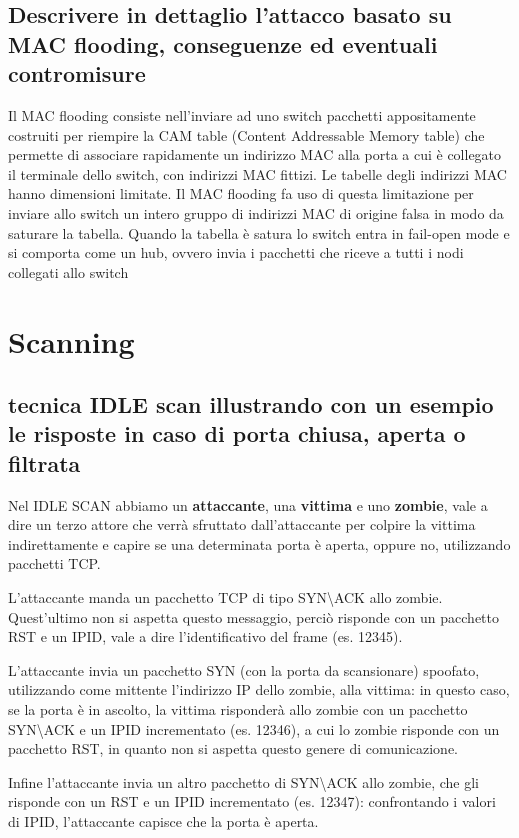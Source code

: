 \documentclass{report}
\begin{document}
\section{Descrivere in dettaglio l'attacco basato su MAC flooding, conseguenze ed eventuali contromisure}
Il MAC flooding consiste nell'inviare ad uno switch pacchetti appositamente costruiti per riempire la CAM table (Content Addressable Memory table) che permette di associare rapidamente un indirizzo MAC alla porta a cui è collegato il terminale dello switch, con indirizzi MAC fittizi.
Le tabelle degli indirizzi MAC hanno dimensioni limitate. Il MAC flooding fa uso di questa limitazione per inviare allo switch un intero gruppo di indirizzi MAC di origine falsa in modo da saturare la tabella. Quando la tabella è satura lo switch entra in fail-open mode e si comporta come un hub, ovvero invia i pacchetti che riceve a tutti i nodi collegati allo switch






\chapter{Scanning}
\section{tecnica IDLE scan illustrando con un esempio le risposte in caso di porta chiusa, aperta o filtrata}
Nel IDLE SCAN abbiamo un \textbf{attaccante}, una \textbf{vittima} e uno \textbf{zombie}, vale a dire un terzo attore che verrà sfruttato dall'attaccante per colpire la vittima indirettamente
e capire se una determinata porta è aperta, oppure no, utilizzando pacchetti TCP.

\noindent L'attaccante manda un pacchetto TCP di tipo SYN\textbackslash ACK allo zombie. Quest'ultimo non si aspetta questo messaggio, perciò risponde con un pacchetto RST e un IPID, vale a dire l'identificativo del frame (es. 12345).

\noindent L'attaccante invia un pacchetto SYN (con la porta da scansionare) spoofato, utilizzando come mittente l'indirizzo IP dello zombie, alla vittima: in questo caso, se la porta è in ascolto, la vittima risponderà 
allo zombie con un pacchetto SYN\textbackslash ACK e un IPID incrementato (es. 12346), a cui lo zombie risponde con un pacchetto RST, in quanto non si aspetta questo genere di comunicazione.

\noindent Infine l'attaccante invia un altro pacchetto di SYN\textbackslash ACK allo zombie, che gli risponde con un RST e un IPID incrementato (es. 12347): confrontando i valori di IPID, l'attaccante capisce che la porta è aperta.
\end{document}
